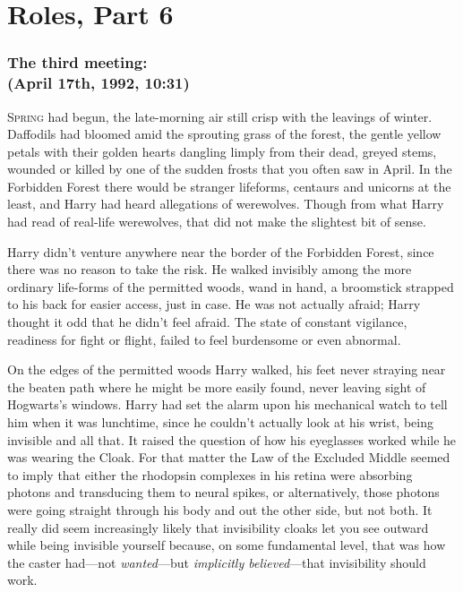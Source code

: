 \chapter{Roles, Part 6}

\subsection{The third meeting:\\
(April 17th, 1992, 10:31\AM)}

\lettrine{S}{pring} had begun, the late-morning air still crisp with the leavings of winter.
Daffodils had bloomed amid the sprouting grass of the forest, the gentle yellow
petals with their golden hearts dangling limply from their dead, greyed stems,
wounded or killed by one of the sudden frosts that you often saw in April. In
the Forbidden Forest there would be stranger lifeforms, centaurs and unicorns
at the least, and Harry had heard allegations of werewolves. Though from what
Harry had read of real-life werewolves, that did not make the slightest bit of
sense.

Harry didn't venture anywhere near the border of the Forbidden Forest, since
there was no reason to take the risk. He walked invisibly among the more
ordinary life-forms of the permitted woods, wand in hand, a broomstick strapped
to his back for easier access, just in case. He was not actually afraid; Harry
thought it odd that he didn't feel afraid. The state of constant vigilance,
readiness for fight or flight, failed to feel burdensome or even abnormal.

On the edges of the permitted woods Harry walked, his feet never straying near
the beaten path where he might be more easily found, never leaving sight of
Hogwarts's windows. Harry had set the alarm upon his mechanical watch to tell
him when it was lunchtime, since he couldn't actually look at his wrist, being
invisible and all that. It raised the question of how his eyeglasses worked
while he was wearing the Cloak. For that matter the Law of the Excluded Middle
seemed to imply that either the rhodopsin complexes in his retina were
absorbing photons and transducing them to neural spikes, or alternatively,
those photons were going straight through his body and out the other side, but
not both. It really did seem increasingly likely that invisibility cloaks let
you see outward while being invisible yourself because, on some fundamental
level, that was how the caster had---not \emph{wanted}---but \emph{implicitly
believed}---that invisibility should work.

